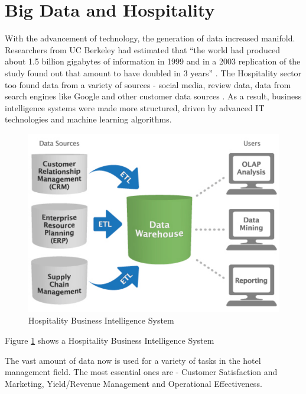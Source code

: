 \documentclass[sigconf]{acmart}
\begin{document}
\section{Big Data and Hospitality}

With the advancement of technology, the generation of data increased manifold. Researchers from UC Berkeley had estimated that ``the world had produced about 1.5 billion gigabytes of information in 1999 and in a 2003 replication of the study found out that amount to have doubled in 3 years'' \cite {gpress04}.
\newline The Hospitality sector too found data from a variety of sources - social media, review data, data from search engines like Google and other customer data sources \cite {bigdatapredictive02}. As a result, business intelligence systems were made more structured, driven by advanced IT technologies and machine learning algorithms.
\begin{figure}
	\includegraphics[width=\columnwidth]{images/business_intelligence_system.pdf}
	\caption{Hospitality Business Intelligence System \cite {businessintelligencetools08}}
        \label{F:Figure1}
\end{figure}
Figure \ref{F:Figure1} shows a Hospitality Business Intelligence System

The vast amount of data now is used for a variety of tasks in the hotel management field. The most essential ones are - Customer Satisfaction and Marketing, Yield/Revenue Management and Operational Effectiveness.
\end{document}
